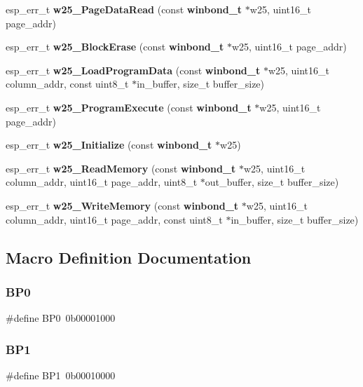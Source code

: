 \begin{DoxyCompactItemize}
\item 
esp\+\_\+err\+\_\+t \textbf{ w25\+\_\+\+Page\+Data\+Read} (const \textbf{ winbond\+\_\+t} $\ast$w25, uint16\+\_\+t page\+\_\+addr)
\item 
esp\+\_\+err\+\_\+t \textbf{ w25\+\_\+\+Block\+Erase} (const \textbf{ winbond\+\_\+t} $\ast$w25, uint16\+\_\+t page\+\_\+addr)
\item 
esp\+\_\+err\+\_\+t \textbf{ w25\+\_\+\+Load\+Program\+Data} (const \textbf{ winbond\+\_\+t} $\ast$w25, uint16\+\_\+t column\+\_\+addr, const uint8\+\_\+t $\ast$in\+\_\+buffer, size\+\_\+t buffer\+\_\+size)
\item 
esp\+\_\+err\+\_\+t \textbf{ w25\+\_\+\+Program\+Execute} (const \textbf{ winbond\+\_\+t} $\ast$w25, uint16\+\_\+t page\+\_\+addr)
\item 
esp\+\_\+err\+\_\+t \textbf{ w25\+\_\+\+Initialize} (const \textbf{ winbond\+\_\+t} $\ast$w25)
\item 
esp\+\_\+err\+\_\+t \textbf{ w25\+\_\+\+Read\+Memory} (const \textbf{ winbond\+\_\+t} $\ast$w25, uint16\+\_\+t column\+\_\+addr, uint16\+\_\+t page\+\_\+addr, uint8\+\_\+t $\ast$out\+\_\+buffer, size\+\_\+t buffer\+\_\+size)
\item 
esp\+\_\+err\+\_\+t \textbf{ w25\+\_\+\+Write\+Memory} (const \textbf{ winbond\+\_\+t} $\ast$w25, uint16\+\_\+t column\+\_\+addr, uint16\+\_\+t page\+\_\+addr, const uint8\+\_\+t $\ast$in\+\_\+buffer, size\+\_\+t buffer\+\_\+size)
\end{DoxyCompactItemize}


\subsection{Macro Definition Documentation}
\mbox{\label{_w25_n01_g_v_8h_aae12db52186464dfd673cfc592bac7d3}} 
\subsubsection{B\+P0}
{\footnotesize\ttfamily \#define B\+P0~0b00001000}

\mbox{\label{_w25_n01_g_v_8h_a4b8245eedb4132a5dbf185f41162755a}} 
\subsubsection{B\+P1}
{\footnotesize\ttfamily \#define B\+P1~0b00010000}

